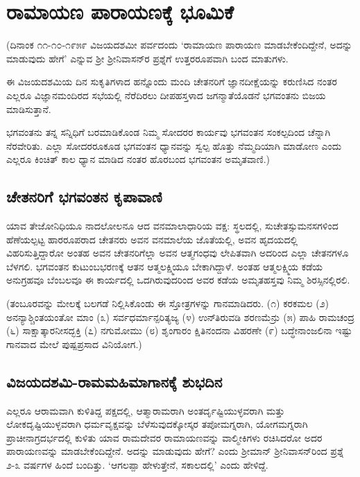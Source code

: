 \chapter{ರಾಮಾಯಣ ಪಾರಾಯಣಕ್ಕೆ ಭೂಮಿಕೆ} 


(ದಿನಾಂಕ ೧೧-೧೦-೧೯೫೯ ವಿಜಯದಶಮೀ ಪರ್ವದಂದು `ರಾಮಾಯಣ ಪಾರಾಯಣ ಮಾಡಬೇಕೆಂದಿದ್ದೇನೆ, ಅದನ್ನು ಮಾಡುವುದು ಹೇಗೆ' ಎನ್ನುವ ಶ್ರೀ ಶ್ರೀನಿವಾಸನ್‍ರ ಪ್ರಶ್ನೆಗೆ ಉತ್ತರರೂಪವಾಗಿ ಬಂದ ಮಾತುಗಳು. 

ಈ ವಿಜಯದಶಮಿಯ ದಿನ ಸುಕೃತಿಗಳಾದ ಹನ್ನೊಂದು ಮಂದಿ ಚೇತನರಿಗೆ ಜ್ಞಾನದೀಕ್ಷೆಯನ್ನು ಕರುಣಿಸಿದ ನಂತರ ಎಲ್ಲರೂ ವಿಜ್ಞಾನಮಂದಿರದ ಸಭೆಯಲ್ಲಿ ನೆರೆದಿರಲು ದೀಪಹಸ್ತಳಾದ ಜಗನ್ಮಾತೆಯೊಡನೆ ಭಗವಂತನು ಬಿಜಯ ಮಾಡಿಸುತ್ತಾನೆ. 

ಭಗವಂತನು ತನ್ನ ಸನ್ನಿಧಿಗೆ ಬರಮಾಡಿಕೊಂಡ ನಿಮ್ಮ ಸೋದರರ ಕಾರ್ಯವು ಭಗವಂತನ ಸಂಕಲ್ಪದಿಂದ ಚೆನ್ನಾಗಿ ನೆರವೇರಿತು. ಎಲ್ಲಾ ಸೋದರರೂಕೂಡ ಭಗವಂತನ ಧ್ಯಾನವನ್ನು ಸ್ವಲ್ಪ ಹೊತ್ತು ನೆಮ್ಮದಿಯಾಗಿ ಮಾಡೋಣ ಎಂದು ಎಲ್ಲರೂ ಕಿಂಚಿತ್‍ ಕಾಲ ಧ್ಯಾನ ಮಾಡಿದ ನಂತರ ಹೊರಬಂದ ಭಗವಂತನ ಅಮೃತವಾಣಿ.) 

\section*{ಚೇತನರಿಗೆ ಭಗವಂತನ ಕೃಪಾವಾಣಿ} 

ಯಾವ ತೇಜೋನಿಧಿಯೂ ನಾದಲೋಲನೂ ಆದ ವನಮಾಲಾಧಾರಿಯ ವಕ್ಷ: ಸ್ಥಲದಲ್ಲಿ, ಸುಚೇತಸ್ಸುಮನಸಗಳಿಂದ ಹೆಣೆಯಲ್ಪಟ್ಟ ಹಾರರೂಪರಾದ ಚೇತನರು ಅವನ ವನಮಾಲೆಯ ಜೊತೆಯಲ್ಲಿ, ಅವನ ಹೃದಯದಲ್ಲಿ ವಿಹರಿಸುತ್ತಿದ್ದಾರೋ ಅಂತಹ ಅವನ ಚೇತನರಿಗೆಲ್ಲಾ ಅವನ ಆತ್ಮಗಂಧವು ಲೇಪಿತವಾಗಿ ಅದರಿಂದ ಎಲ್ಲಾ ಚೇತನಗಳೂ ಬೆಳಗಲಿ. ಭಗವಂತನ ಕುಟುಂಬಭರಣಕ್ಕೆ ಆತನ ಆತ್ಮಲಕ್ಷ್ಮಿಯೂ ಬೇಕಾಗಿದ್ದಾಳೆ. ಅಂತಹ ಆತ್ಮಲಕ್ಷ್ಮಿಯ ಕಡೆಯ ಅನುಗ್ರಹವೂ ಬೆಂಬಲವೂ ಈ ಕಾರ್ಯದಲ್ಲಿ ಒದಗಿರುವುದರಿಂದ ಅವರ ಕಡೆಯ ಅಮೃತಹಸ್ತವು ನಿಮ್ಮ ಶಿರಸ್ಸಿನಲ್ಲಿರಲಿ. 

(ತಂಬೂರವನ್ನು ಮೇಲಕ್ಕೆ ಬಲಗಡೆ ನಿಲ್ಲಿಸಿಕೊಂಡು ಈ ಸ್ತೋತ್ರಗಳನ್ನು ಗಾನಮಾಡಿದರು. (೧) ಕರಕಮಲ (೨) ಅನನ್ಯಾಶ್ಚಿಂತಯಂತೋ ಮಾಂ (೩) ಸರ್ವಧರ್ಮಾನ್ಪರಿತ್ಯಜ್ಯ (೪) ಉನ್‍ತಿರುವಡಿ ಶರಣಮೆನ್ರು (೫) ಪಾಹಿ ರಾಮಚಂದ್ರ (೬) ಸಾಕ್ಷಾತ್ಕಾರನೀಸದ್ಭಕ್ತಿ (೭) ನಗುಮೋಮು (೮) ಶೃಂಗಾರಂ ಕ್ಷಿತಿನಂದನಾ ವಿಹರಣೇ (೯) ಬದ್ಧೇನಾಂಜಲಿನಾ ಇಷ್ಟು ಗಾನವಾದ ಮೇಲೆ ಪುಷ್ಪಪ್ರಸಾದ ವಿನಿಯೋಗ.) 

\section*{ವಿಜಯದಶಮಿ-ರಾಮಮಹಿಮಾಗಾನಕ್ಕೆ ಶುಭದಿನ} 

ಎಲ್ಲರೂ ಆರಾಮವಾಗಿ ಕುಳಿತಿದ್ದ ಪಕ್ಷದಲ್ಲಿ, ಆತ್ಮಾರಾಮರಾಗಿ ಅಂತರ್ದೃಷ್ಟಿಯುಳ್ಳವರಾಗಿ ಮತ್ತು ಲೋಕದೃಷ್ಟಿಯುಳ್ಳವರಾಗಿ ಧರ್ಮವೃಕ್ಷವನ್ನು ಬೆಳೆಸುವುದಕ್ಕೋಸ್ಕರ ತಪೋಮಗ್ನರಾಗಿ, ಯೋಗಮಗ್ನರಾಗಿ ಪ್ರಾಚೀನಾಗ್ರದರ್ಭದಲ್ಲಿ ಕುಳಿತು ಯಾವ ರಾಮದೇವರ ರಾಮಾಯಣವನ್ನು ವಾಲ್ಮೀಕಿಗಳು ರಚಿಸಿದರೋ ಅದರ ಪಾರಾಯಣವನ್ನು ಮಾಡಬೇಕೆಂದಿದ್ದೇನೆ. ಅದನ್ನು ಮಾಡುವುದು ಹೇಗೆ? ಎಂದು ಶ್ರೀಮಾನ್‍ ಶ್ರೀನಿವಾಸನ್‍ರಿಂದ ಪ್ರಶ್ನೆ ೨-೩ ವರ್ಷಗಳ ಹಿಂದೆ ಬಂದಿತ್ತು. `ಆಗಲಪ್ಪಾ ಹೇಳುತ್ತೇನೆ, ಸಕಾಲದಲ್ಲಿ' ಎಂದು ಹೇಳಿದ್ದೆ. 

